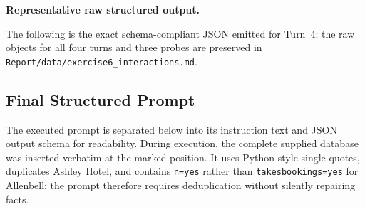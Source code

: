 \documentclass[11pt]{article}
\newcommand{\dialogueheading}[1]{\par\smallskip\noindent\textbf{#1}\par}
\begin{document}
\newpage
\dialogueheading{Representative raw structured output.}
The following is the exact schema-compliant JSON emitted for Turn~4; the raw
objects for all four turns and three probes are preserved in
\texttt{Report/data/exercise6\_interactions.md}.


\clearpage
\subsection{Final Structured Prompt}\label{app:prompt}
The executed prompt is separated below into its instruction text and JSON
output schema for readability. During execution, the complete supplied
database was inserted verbatim at the marked position. It uses Python-style
single quotes, duplicates Ashley Hotel, and contains \texttt{n=yes} rather
than \texttt{takesbookings=yes} for Allenbell; the prompt therefore requires
deduplication without silently repairing facts.
\end{document}
